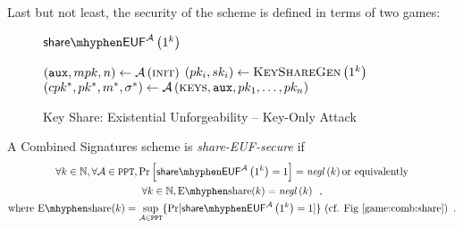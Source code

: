   Last but not least, the security of the scheme is defined in terms of two
  games:
  \begin{figure}[!htbp]
    \begin{gamebox}{$\mathsf{share \mhyphen
    EUF}^{\adversary}\left(1^k\right)$}
      \begin{algorithmic}[1]
        \State $\left(\mathtt{aux}, mpk, n\right) \gets
        \mathcal{A}\left(\textsc{init}\right)$
          \State $\left(pk_i, sk_i\right) \gets
          \textsc{KeyShareGen}\left(1^k\right)$
        \EndFor
        \State $\left(cpk^*, pk^*, m^*, \sigma^*\right) \gets
        \mathcal{A}\left(\textsc{keys}, \mathtt{aux}, pk_1, \dots, pk_n\right)$
          \State {}
        \Else
          \State {}
        \EndIf
      \end{algorithmic}
    \end{gamebox}
    \caption{Key Share: Existential Unforgeability -- Key-Only Attack}
    \label{game:comb:share}
  \end{figure}
  \begin{definition}
    \label{def:share:secure}
    A Combined Signatures scheme is \emph{\textsf{share-EUF}-secure} if
    \begin{gather*}
      \forall k \in \mathbb{N}, \forall \adversary \in \mathtt{PPT},
      \Pr\left[\mathsf{share \mhyphen EUF}^{\adversary}\left(1^k\right) =
      1\right] = \mathit{negl}\left(k\right) \text{or equivalently} \\
      \forall k \in \mathbb{N}, \mathrm{E \mhyphen share}(k) =
      \mathit{negl}\left(k\right) \enspace, \\
      \text{where } \mathrm{E \mhyphen share}(k) = \underset{\adversary \in
      \mathtt{PPT}}{\sup}\{\Pr[\mathsf{share \mhyphen
      EUF}^{\adversary}\left(1^k\right) = 1]\} \text{ (cf.
      Fig~\ref{game:comb:share})} \enspace.
    \end{gather*}
  \end{definition}


